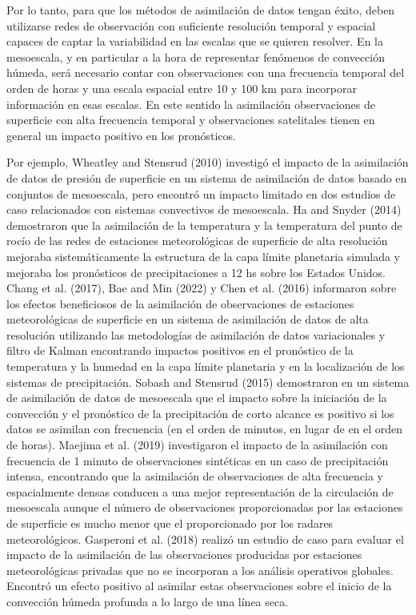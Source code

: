 \documentclass[12pt,oneside]{reedthesis}
\begin{document}
Por lo tanto, para que los métodos de asimilación de datos tengan éxito, deben utilizarse redes de observación con suficiente resolución temporal y espacial capaces de captar la variabilidad en las escalas que se quieren resolver. En la mesoescala, y en particular a la hora de representar fenómenos de convección húmeda, será necesario contar con observaciones con una frecuencia temporal del orden de horas y una escala espacial entre 10 y 100 km para incorporar información en esas escalas. En este sentido la asimilación observaciones de superficie con alta frecuencia temporal y observaciones satelitales tienen en general un impacto positivo en los pronósticos.

Por ejemplo, Wheatley and Stensrud (2010) investigó el impacto de la asimilación de datos de presión de superficie en un sistema de asimilación de datos basado en conjuntos de mesoescala, pero encontró un impacto limitado en dos estudios de caso relacionados con sistemas convectivos de mesoescala. Ha and Snyder (2014) demostraron que la asimilación de la temperatura y la temperatura del punto de rocío de las redes de estaciones meteorológicas de superficie de alta resolución mejoraba sistemáticamente la estructura de la capa límite planetaria simulada y mejoraba los pronósticos de precipitaciones a 12 hs sobre los Estados Unidos. Chang et al. (2017), Bae and Min (2022) y Chen et al. (2016) informaron sobre los efectos beneficiosos de la asimilación de observaciones de estaciones meteorológicas de superficie en un sistema de asimilación de datos de alta resolución utilizando las metodologías de asimilación de datos variacionales y filtro de Kalman encontrando impactos positivos en el pronóstico de la temperatura y la humedad en la capa límite planetaria y en la localización de los sistemas de precipitación. Sobash and Stensrud (2015) demostraron en un sistema de asimilación de datos de mesoescala que el impacto sobre la iniciación de la convección y el pronóstico de la precipitación de corto alcance es positivo si los datos se asimilan con frecuencia (en el orden de minutos, en lugar de en el orden de horas). Maejima et al. (2019) investigaron el impacto de la asimilación con frecuencia de 1 minuto de observaciones sintéticas en un caso de precipitación intensa, encontrando que la asimilación de observaciones de alta frecuencia y espacialmente densas conducen a una mejor representación de la circulación de mesoescala aunque el número de observaciones proporcionadas por las estaciones de superficie es mucho menor que el proporcionado por los radares meteorológicos. Gasperoni et al. (2018) realizó un estudio de caso para evaluar el impacto de la asimilación de las observaciones producidas por estaciones meteorológicas privadas que no se incorporan a los análisis operativos globales. Encontró un efecto positivo al asimilar estas observaciones sobre el inicio de la convección húmeda profunda a lo largo de una línea seca.
\end{document}
